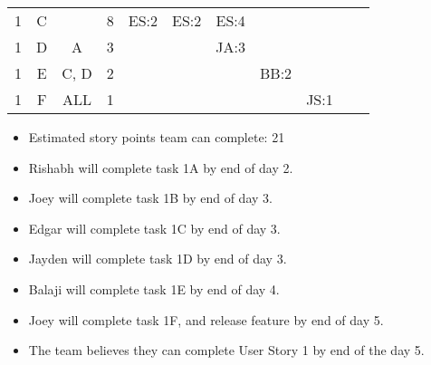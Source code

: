 \documentclass[12pt]{article}
\begin{document}
\begin{table}[H]
\begin{tabular}{@{}c|c|c|c|ccccccc@{}}
1     & C    &            & 8                                                      & ES:2                                            & ES:2                                            & ES:4                                             &                                                  &                                                  &                                                  &                                                  \\
1     & D    & A          & 3                                                      &                                                 &                                                 & JA:3                                             &                                                  &                                                  &                                                  &                                                  \\
1     & E    & C, D       & 2                                                      &                                                 &                                                 &                                                  & BB:2                                             &                                                  &                                                  &                                                  \\
1     & F    & ALL        & 1                                                      &                                                 &                                                 &                                                  &                                                  & JS:1                                             &                                                  &                                                  \\ \bottomrule
\end{tabular}
\end{table}

\begin{itemize}%
\item Estimated story points team can complete: 21
\item Rishabh will complete task 1A by end of day 2.
\item Joey will complete task 1B by end of day 3.
\item Edgar will complete task 1C by end of day 3.
\item Jayden will complete task 1D by end of day 3.
\item Balaji will complete task 1E by end of day 4.
\item Joey will complete task 1F, and release feature by end of day 5.
\item The team believes they can complete User Story 1 by end of the day 5. 
\end{itemize}
\end{document}
